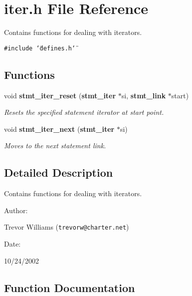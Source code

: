 \section{iter.h File Reference}
\label{iter_8h}
Contains functions for dealing with iterators. 


{\tt \#include \char`\"{}defines.h\char`\"{}}\par
\subsection*{Functions}
\begin{CompactItemize}
\item 
void {\bf stmt\_\-iter\_\-reset} ({\bf stmt\_\-iter} $\ast$si, {\bf stmt\_\-link} $\ast$start)
\begin{CompactList}\small\item\em Resets the specified statement iterator at start point.\item\end{CompactList}\item 
void {\bf stmt\_\-iter\_\-next} ({\bf stmt\_\-iter} $\ast$si)
\begin{CompactList}\small\item\em Moves to the next statement link.\item\end{CompactList}\end{CompactItemize}


\subsection{Detailed Description}
Contains functions for dealing with iterators.



\begin{Desc}
\item[Author: ]\par
Trevor Williams ({\tt trevorw@charter.net}) \end{Desc}
\begin{Desc}
\item[Date: ]\par
10/24/2002\end{Desc}


\subsection{Function Documentation}
